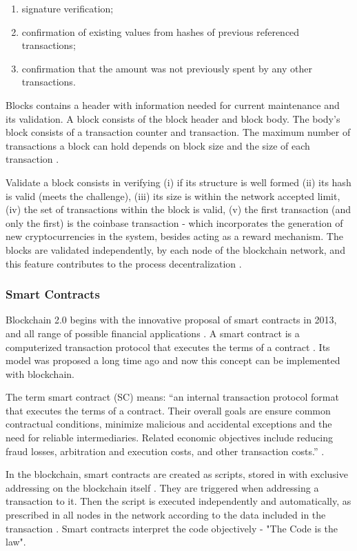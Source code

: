 \begin{enumerate}
	\item signature verification;
	\item confirmation of existing values from hashes of previous referenced transactions;
	\item confirmation that the amount was not previously spent by any other transactions.
\end{enumerate}

\label{sec:blocks}
Blocks contains a header with information needed for current maintenance and its validation. A block consists of the block header and block body. The body's block consists of a transaction counter and transaction. The maximum number of transactions a block can hold depends on block size and the size of each transaction \cite{zheng2016blockchain}.

Validate a block consists in verifying (i) if its structure is well formed (ii) its hash is valid (meets the challenge), (iii) its size is within the network accepted limit, (iv) the set of transactions within the block is valid, (v) the first transaction (and only the first) is the coinbase transaction - which incorporates the generation of new cryptocurrencies in the system, besides acting as a reward mechanism. The blocks are validated independently, by each node of the blockchain network, and this feature contributes to the process decentralization \cite{greve2018blockchain}.

\subsubsection{Smart Contracts}\label{sec:smartContracts}
Blockchain 2.0 begins with the innovative proposal of smart contracts in 2013, and all range of possible financial applications \cite{greve2018blockchain}. A smart contract is a computerized transaction protocol that executes the terms of a contract \cite{szabo1997idea}. Its model was proposed a long time ago and now this concept can be implemented with blockchain.

The term smart contract (SC) means: “an internal transaction protocol format that executes the terms of a contract. Their overall goals are ensure common contractual conditions, minimize malicious and accidental exceptions and the need for reliable intermediaries. Related economic objectives include reducing fraud losses, arbitration and execution costs, and other transaction costs.” \cite{szabo1997idea}.

In the blockchain, smart contracts are created as scripts, stored in with exclusive addressing on the blockchain itself \cite{greve2018blockchain}. They are triggered when addressing a transaction to it. Then the script is executed independently and automatically, as prescribed in all nodes in the network according to the data included in the transaction \cite{christidis2016blockchains}. Smart contracts interpret the code objectively - "The Code is the law".

